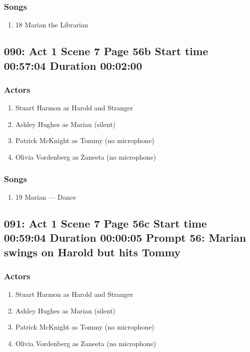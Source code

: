 \subsubsection{Songs}
\begin{enumerate}
\item 18 Marian the Librarian
\end{enumerate}
\subsection{090: Act 1 Scene 7 Page 56b Start time 00:57:04 Duration 00:02:00}

\subsubsection{Actors}
\begin{enumerate}
\item Stuart Harmon as Harold and Stranger
\item Ashley Hughes as Marian (silent)
\item Patrick McKnight as Tommy (no microphone)
\item Olivia Vordenberg as Zaneeta (no microphone)
\end{enumerate}

\subsubsection{Songs}
\begin{enumerate}
\item 19 Marian --- Dance
\end{enumerate}
\subsection{091: Act 1 Scene 7 Page 56c Start time 00:59:04 Duration 00:00:05 Prompt 56: Marian swings on Harold but hits Tommy}

\subsubsection{Actors}
\begin{enumerate}
\item Stuart Harmon as Harold and Stranger
\item Ashley Hughes as Marian (silent)
\item Patrick McKnight as Tommy (no microphone)
\item Olivia Vordenberg as Zaneeta (no microphone)
\end{enumerate}

